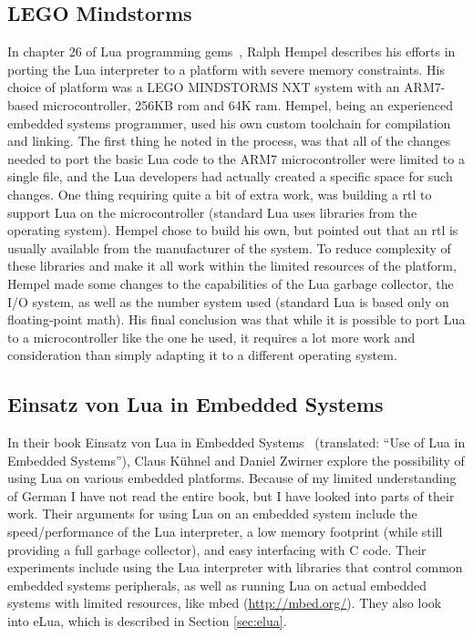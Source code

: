 \subsection{LEGO Mindstorms}
\label{sec:lego_mindstorms}
In chapter 26 of \guillemotleft Lua programming gems\guillemotright~\cite{chapter:porting_lua_microcontroller}, Ralph Hempel describes his efforts in porting the Lua interpreter to a platform with severe memory constraints. His choice of platform was a LEGO MINDSTORMS NXT system with an ARM7-based microcontroller, 256KB \gls{rom} and 64K \gls{ram}. Hempel, being an experienced embedded systems programmer, used his own custom toolchain for compilation and linking. The first thing he noted in the process, was that all of the changes needed to port the basic Lua code to the ARM7 microcontroller were limited to a single file, and the Lua developers had actually created a specific space for such changes. One thing requiring quite a bit of extra work, was building a \gls{rtl} to support Lua on the microcontroller (standard Lua uses libraries from the operating system). Hempel chose to build his own, but pointed out that an \gls{rtl} is usually available from the manufacturer of the system. To reduce complexity of these libraries and make it all work within the limited resources of the platform, Hempel made some changes to the capabilities of the Lua garbage collector, the I/O system, as well as the number system used (standard Lua is based only on floating-point math). His final conclusion was that while it is possible to port Lua to a microcontroller like the one he used, it requires a lot more work and consideration than simply adapting it to a different operating system.

\subsection{Einsatz von Lua in Embedded Systems}
\label{sec:einsatz_von_lua_embedded}
In their book \guillemotleft Einsatz von Lua in Embedded Systems\guillemotright~\cite{book:einsatz_von_lua_embedded} (translated: ``Use of Lua in Embedded Systems''), Claus Kühnel and Daniel Zwirner explore the possibility of using Lua on various embedded platforms. Because of my limited understanding of German I have not read the entire book, but I have looked into parts of their work. Their arguments for using Lua on an embedded system include the speed/performance of the Lua interpreter, a low memory footprint (while still providing a full garbage collector), and easy interfacing with C code. Their experiments include using the Lua interpreter with libraries that control common embedded systems peripherals, as well as running Lua on actual embedded systems with limited resources, like mbed (\url{http://mbed.org/}). They also look into eLua, which is described in Section \ref{sec:elua}.

